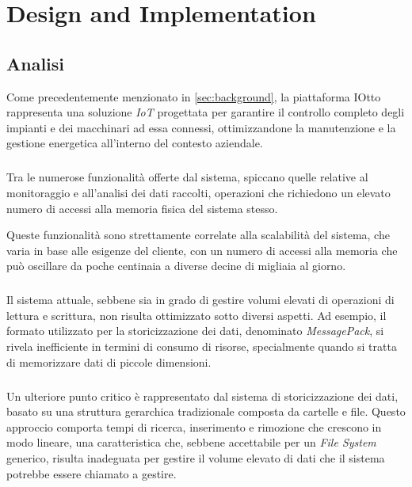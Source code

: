 \documentclass[12pt,a4paper,openright,twoside]{book}
\begin{document}
\chapter{Design and Implementation}

    \section{Analisi}

        Come precedentemente menzionato in \cref{sec:background}, la piattaforma IOtto rappresenta una soluzione \textit{IoT} progettata per garantire il controllo completo degli impianti e dei macchinari ad essa connessi, ottimizzandone la manutenzione e la gestione energetica all'interno del contesto aziendale.

        \paragraph*{}

        Tra le numerose funzionalità offerte dal sistema, spiccano quelle relative al monitoraggio e all'analisi dei dati raccolti, operazioni che richiedono un elevato numero di accessi alla memoria fisica del sistema stesso.

        Queste funzionalità sono strettamente correlate alla scalabilità del sistema, che varia in base alle esigenze del cliente, con un numero di accessi alla memoria che può oscillare da poche centinaia a diverse decine di migliaia al giorno.

        \paragraph*{}

        Il sistema attuale, sebbene sia in grado di gestire volumi elevati di operazioni di lettura e scrittura, non risulta ottimizzato sotto diversi aspetti. Ad esempio, il formato utilizzato per la storicizzazione dei dati, denominato \textit{MessagePack}, si rivela inefficiente in termini di consumo di risorse, specialmente quando si tratta di memorizzare dati di piccole dimensioni.

        \paragraph*{}

        Un ulteriore punto critico è rappresentato dal sistema di storicizzazione dei dati, basato su una struttura gerarchica tradizionale composta da cartelle e file. Questo approccio comporta tempi di ricerca, inserimento e rimozione che crescono in modo lineare, una caratteristica che, sebbene accettabile per un \textit{File System} generico, risulta inadeguata per gestire il volume elevato di dati che il sistema potrebbe essere chiamato a gestire.
\end{document}
